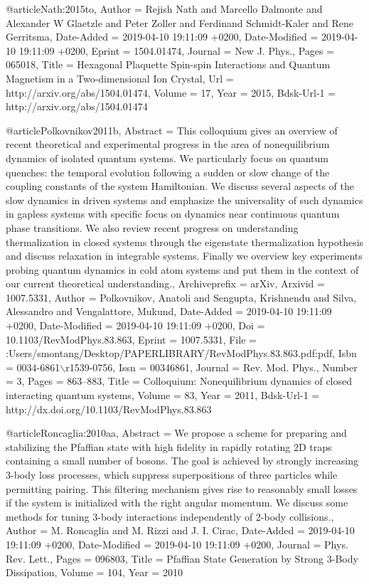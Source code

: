 \documentclass[epj,final]{svjour}
\begin{document}
{@article{Nath:2015to,
	Author = {Rejish Nath and Marcello Dalmonte and Alexander W Glaetzle and Peter Zoller and Ferdinand Schmidt-Kaler and Rene Gerritsma},
	Date-Added = {2019-04-10 19:11:09 +0200},
	Date-Modified = {2019-04-10 19:11:09 +0200},
	Eprint = {1504.01474},
	Journal = {New J. Phys.},
	Pages = {065018},
	Title = {Hexagonal Plaquette Spin-spin Interactions and Quantum Magnetism in a Two-dimensional Ion Crystal},
	Url = {http://arxiv.org/abs/1504.01474},
	Volume = {17},
	Year = {2015},
	Bdsk-Url-1 = {http://arxiv.org/abs/1504.01474}}

@article{Polkovnikov2011b,
	Abstract = {This colloquium gives an overview of recent theoretical and experimental progress in the area of nonequilibrium dynamics of isolated quantum systems. We particularly focus on quantum quenches: the temporal evolution following a sudden or slow change of the coupling constants of the system Hamiltonian. We discuss several aspects of the slow dynamics in driven systems and emphasize the universality of such dynamics in gapless systems with specific focus on dynamics near continuous quantum phase transitions. We also review recent progress on understanding thermalization in closed systems through the eigenstate thermalization hypothesis and discuss relaxation in integrable systems. Finally we overview key experiments probing quantum dynamics in cold atom systems and put them in the context of our current theoretical understanding.},
	Archiveprefix = {arXiv},
	Arxivid = {1007.5331},
	Author = {Polkovnikov, Anatoli and Sengupta, Krishnendu and Silva, Alessandro and Vengalattore, Mukund},
	Date-Added = {2019-04-10 19:11:09 +0200},
	Date-Modified = {2019-04-10 19:11:09 +0200},
	Doi = {10.1103/RevModPhys.83.863},
	Eprint = {1007.5331},
	File = {:Users/smontang/Desktop/PAPERLIBRARY/RevModPhys.83.863.pdf:pdf},
	Isbn = {0034-6861$\backslash$r1539-0756},
	Issn = {00346861},
	Journal = {Rev. Mod. Phys.},
	Number = {3},
	Pages = {863--883},
	Title = {{Colloquium: Nonequilibrium dynamics of closed interacting quantum systems}},
	Volume = {83},
	Year = {2011},
	Bdsk-Url-1 = {http://dx.doi.org/10.1103/RevModPhys.83.863}}

@article{Roncaglia:2010aa,
	Abstract = {We propose a scheme for preparing and stabilizing the Pfaffian state with high fidelity in rapidly rotating 2D traps containing a small number of bosons. The goal is achieved by strongly increasing 3-body loss processes, which suppress superpositions of three particles while permitting pairing. This filtering mechanism gives rise to reasonably small losses if the system is initialized with the right angular momentum. We discuss some methods for tuning 3-body interactions independently of 2-body collisions.},
	Author = {M. Roncaglia and M. Rizzi and J. I. Cirac},
	Date-Added = {2019-04-10 19:11:09 +0200},
	Date-Modified = {2019-04-10 19:11:09 +0200},
	Journal = {Phys. Rev. Lett.},
	Pages = {096803},
	Title = {Pfaffian State Generation by Strong 3-Body Dissipation},
	Volume = {104},
	Year = {2010}}

}
\end{document}
